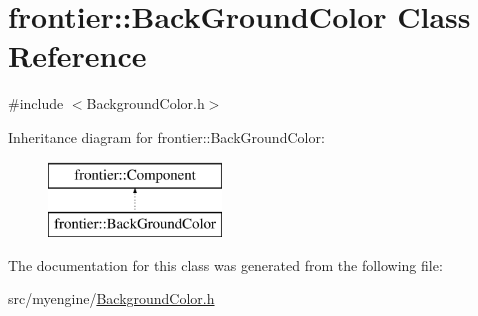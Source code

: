 \hypertarget{classfrontier_1_1_back_ground_color}{}\section{frontier\+:\+:Back\+Ground\+Color Class Reference}
\label{classfrontier_1_1_back_ground_color}


{\ttfamily \#include $<$Background\+Color.\+h$>$}

Inheritance diagram for frontier\+:\+:Back\+Ground\+Color\+:\begin{figure}[H]
\begin{center}
\leavevmode
\includegraphics[height=2.000000cm]{classfrontier_1_1_back_ground_color}
\end{center}
\end{figure}


The documentation for this class was generated from the following file\+:\begin{DoxyCompactItemize}
\item 
src/myengine/\hyperlink{_background_color_8h}{Background\+Color.\+h}\end{DoxyCompactItemize}
